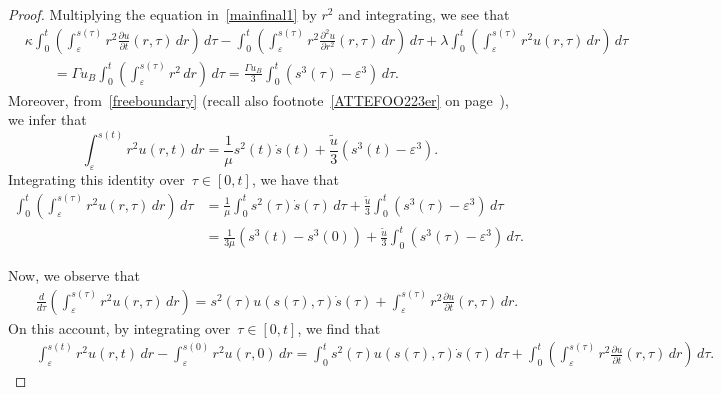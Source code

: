 \documentclass[12pt,a4paper,intlimits,sumlimits]{amsart}
\theoremstyle{definition}
\theoremstyle{plain}
\numberwithin{equation}{section}
\begin{document}
\begin{proof} Multiplying the equation in~\eqref{mainfinal1}
by $r^2$ and integrating, we see that
\begin{equation}\label{xcfgyucsfghujicvh}
\begin{split}
&\kappa\int_0^t\left(\int_\varepsilon^{s(\tau)}r^2\frac{\partial u}{\partial t}(r,\tau)\, dr\right)\,d\tau-\int_0^t\left(\int_\varepsilon^{s(\tau)}r^2\frac{\partial^2u}{\partial r^2}(r,\tau)\, dr\right)\,d\tau+\lambda\int_0^t\left(\int_\varepsilon^{s(\tau)}r^2 u(r,\tau)\, dr\right)\,d\tau \\&\qquad=\Gamma u_B\int_0^t\left(\int_\varepsilon^{s(\tau)}r^2\, dr\right)\,d\tau=\frac{\Gamma u_B}3\int_0^t (s^3(\tau)-\varepsilon^3) \,d\tau.
\end{split}
\end{equation}
Moreover, from~\eqref{freeboundary} (recall also footnote~\ref{ATTEFOO223er} on page~\pageref{ATTEFOO223er}),
we infer that
\begin{equation}\label{xcfgyucsfghujicvh1}
\int_\varepsilon^{s(t)}r^2 u(r,t)\,dr=\frac{1}{\mu}s^2(t)\dot s(t)+\frac{\widetilde u}{3}(s^3(t)-\varepsilon^3).\end{equation}
Integrating this identity over~$\tau\in[0,t]$, we have that
\begin{equation}\label{xcfgyucsfghujicvh4}
\begin{aligned}
\int_0^t\left(\int_\varepsilon^{s(\tau)}r^2 u(r,\tau)\,dr\right)\,d\tau&=
\frac{1}{\mu}\int_0^t s^2(\tau)\dot s(\tau)\,d\tau+\frac{\widetilde u}{3}\int_0^t(s^3(\tau)-\varepsilon^3)\,d\tau \\
&=\frac{1}{3\mu}(s^3(t)-s^3(0))+\frac{\widetilde u}{3}\int_0^t(s^3(\tau)-\varepsilon^3)\,d\tau.
\end{aligned}
\end{equation}

Now, we observe that
\begin{eqnarray*}&&
\frac{d}{d\tau}\left(\int_\varepsilon^{s(\tau)}r^2u(r,\tau)\,dr\right)
=s^2(\tau) u(s(\tau),\tau)\dot s(\tau)+
\int_\varepsilon^{s(\tau)}r^2\frac{\partial u}{\partial t}(r,\tau)\,dr.
\end{eqnarray*}
On this account, by integrating over~$\tau\in[0,t]$,
we find that
\begin{eqnarray*}&&
\int_\varepsilon^{s(t)}r^2u(r,t)\,dr
-\int_\varepsilon^{s(0)}r^2u(r,0)\,dr
=\int_0^t
s^2(\tau) u(s(\tau),\tau)\dot s(\tau)\,d\tau+\int_0^t\left(
\int_\varepsilon^{s(\tau)}r^2\frac{\partial u}{\partial t}(r,\tau)\,dr\right)\,d\tau.
\end{eqnarray*}


\end{proof}
\end{document}
